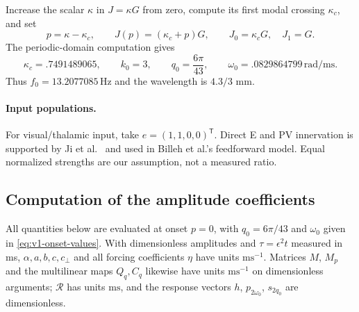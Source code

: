 \documentclass[11pt]{article}
\newcommand{\cR}{\mathcal{R}}
\begin{document}
Increase the scalar $\kappa$ in $J=\kappa G$ from zero, compute its first
modal crossing $\kappa_c$, and set
\begin{equation}
 p=\kappa-\kappa_c,\qquad J(p)=(\kappa_c+p)G,
 \qquad J_0=\kappa_cG,\quad J_1=G.
 \label{eq:v1-gain-parameter}
\end{equation}
The periodic-domain computation gives
\begin{equation}
 \kappa_c=.7491489065,\qquad k_0=3,\qquad
 q_0=\frac{6\pi}{43},\qquad
 \omega_0=.0829864799\,\mathrm{rad/ms}.
 \label{eq:v1-onset-values}
\end{equation}
Thus $f_0=13.2077085\,\mathrm{Hz}$ and the wavelength is $4.3/3$ mm.

\paragraph{Input populations.}
For visual/thalamic input, take $e=(1,1,0,0)^{\mathsf T}$.
Direct E and PV innervation is supported by Ji et al.~\cite{ji2016}
and used in Billeh et al.'s feedforward model. Equal normalized strengths
are our assumption, not a measured ratio.

\subsection{Computation of the amplitude coefficients}
All quantities below are evaluated at onset $p=0$, with
$q_0=6\pi/43$ and $\omega_0$ given in \eqref{eq:v1-onset-values}.
With dimensionless amplitudes and $\tau=\epsilon^2t$ measured in ms,
$\alpha,a,b,c,c_\perp$ and all forcing coefficients $\eta$ have units
$\mathrm{ms}^{-1}$. Matrices $M$, $M_p$ and the multilinear maps $Q_q,C_q$
likewise have units $\mathrm{ms}^{-1}$ on dimensionless arguments;
$\cR$ has units $\mathrm{ms}$, and the response vectors $h$, $p_{2\omega_0}$,
$s_{2q_0}$ are dimensionless.
\end{document}
